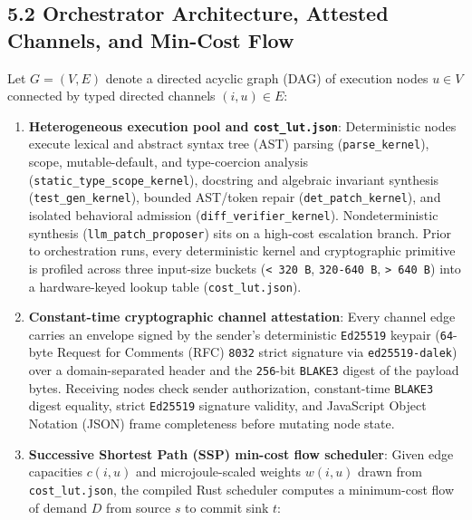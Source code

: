 \documentclass[10pt,letterpaper]{article}
\providecommand{\tightlist}{\setlength{\itemsep}{1pt}\setlength{\parskip}{0pt}}
\begin{document}
\subsection{5.2 Orchestrator Architecture, Attested Channels, and
Min-Cost
Flow}\label{orchestrator-architecture-attested-channels-and-min-cost-flow}

Let \(G = (V, E)\) denote a directed acyclic graph (DAG) of execution
nodes \(u \in V\) connected by typed directed channels \((i, u) \in E\):

\begin{enumerate}
\def\labelenumi{\arabic{enumi}.}
\tightlist
\item
  \textbf{Heterogeneous execution pool and \texttt{cost\_\allowbreak{}lut.\allowbreak{}json}}:
  Deterministic nodes execute lexical and abstract syntax tree (AST)
  parsing (\texttt{parse\_\allowbreak{}kernel}), scope, mutable-default, and
  type-coercion analysis (\texttt{static\_\allowbreak{}type\_\allowbreak{}scope\_\allowbreak{}kernel}),
  docstring and algebraic invariant synthesis
  (\texttt{test\_\allowbreak{}gen\_\allowbreak{}kernel}), bounded AST/token repair
  (\texttt{det\_\allowbreak{}patch\_\allowbreak{}kernel}), and isolated behavioral admission
  (\texttt{diff\_\allowbreak{}verifier\_\allowbreak{}kernel}). Nondeterministic synthesis
  (\texttt{llm\_\allowbreak{}patch\_\allowbreak{}proposer}) sits on a high-cost escalation branch.
  Prior to orchestration runs, every deterministic kernel and
  cryptographic primitive is profiled across three input-size buckets
  (\texttt{\textless{}\ 320\ B}, \texttt{320-\allowbreak{}640\ B},
  \texttt{\textgreater{}\ 640\ B}) into a hardware-keyed lookup table
  (\texttt{cost\_\allowbreak{}lut.\allowbreak{}json}).
\item
  \textbf{Constant-time cryptographic channel attestation}: Every
  channel edge carries an envelope signed by the sender's deterministic
  \texttt{Ed25519} keypair (\texttt{64}-byte Request for Comments (RFC)
  \texttt{8032} strict signature via \texttt{ed25519-\allowbreak{}dalek}) over a
  domain-separated header and the \texttt{256}-bit \texttt{BLAKE3}
  digest of the payload bytes. Receiving nodes check sender
  authorization, constant-time \texttt{BLAKE3} digest equality, strict
  \texttt{Ed25519} signature validity, and JavaScript Object Notation
  (JSON) frame completeness before mutating node state.
\item
  \textbf{Successive Shortest Path (SSP) min-cost flow scheduler}: Given
  edge capacities \(c(i, u)\) and microjoule-scaled weights \(w(i, u)\)
  drawn from \texttt{cost\_\allowbreak{}lut.\allowbreak{}json}, the compiled Rust scheduler
  computes a minimum-cost flow of demand \(D\) from source \(s\) to
  commit sink \(t\):
\end{enumerate}
\end{document}
